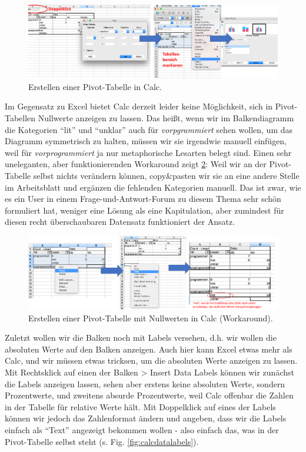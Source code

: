 \documentclass[]{article}
\begin{document}
\begin{figure}
\includegraphics[width=6.66in]{docs/fig/calc_chart} \caption{Erstellen einer Pivot-Tabelle in Calc.}\label{fig:calcchart}
\end{figure}

Im Gegensatz zu Excel bietet Calc derzeit leider keine Möglichkeit, sich
in Pivot-Tabellen Nullwerte anzeigen zu lassen. Das heißt, wenn wir im
Balkendiagramm die Kategorien ``lit'' und ``unklar'' auch für
\emph{vorpgrammiert} sehen wollen, um das Diagramm symmetrisch zu
halten, müssen wir sie irgendwie manuell einfügen, weil für
\emph{vorprogrammiert} ja nur metaphorische Lesarten belegt sind. Einen
sehr uneleganten, aber funktionierenden Workaround zeigt
\ref{fig:calcchart2}: Weil wir an der Pivot-Tabelle selbst nichts
verändern können, copy\&pasten wir sie an eine andere Stelle im
Arbeitsblatt und ergänzen die fehlenden Kategorien manuell. Das ist
zwar, wie es ein User in einem Frage-und-Antwort-Forum zu diesem Thema
sehr schön formuliert hat, weniger eine Lösung als eine Kapitulation,
aber zumindest für diesen recht überschaubaren Datensatz funktioniert
der Ansatz.

\begin{figure}
\includegraphics[width=6.66in]{docs/fig/calc_chart2} \caption{Erstellen einer Pivot-Tabelle mit Nullwerten in Calc (Workaround).}\label{fig:calcchart2}
\end{figure}

Zuletzt wollen wir die Balken noch mit Labels versehen, d.h. wir wollen
die absoluten Werte auf den Balken anzeigen. Auch hier kann Excel etwas
mehr als Calc, und wir müssen etwas tricksen, um die absoluten Werte
anzeigen zu lassen. Mit Rechtsklick auf einen der Balken \textgreater{}
Insert Data Labels können wir zunächst die Labels anzeigen lassen, sehen
aber erstens keine absoluten Werte, sondern Prozentwerte, und zweitens
absurde Prozentwerte, weil Calc offenbar die Zahlen in der Tabelle für
relative Werte hält. Mit Doppelklick auf eines der Labels können wir
jedoch das Zahlenformat ändern und angeben, dass wir die Labels einfach
als ``Text'' angezeigt bekommen wollen - also einfach das, was in der
Pivot-Tabelle selbst steht (s. Fig. \ref{fig:calcdatalabels}).
\end{document}
